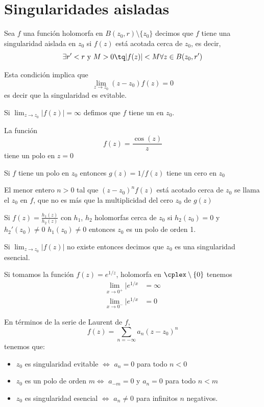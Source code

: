 \documentclass{apuntes}
\begin{document}
\section{Singularidades aisladas}

\begin{defn}
Sea $f$ una función holomorfa en $B(z_0,r)\setminus\{z_0\}$ decimos que $f$ tiene una singularidad aislada en $z_0$ si $f(z)$ está acotada cerca de $z_0$, es decir,
\[\exists r'<r \text{ y } M>0 \tq |f(z)| < M \forall z \in B(z_0, r')\]

Esta condición implica que
\[\lim_{z \to z_0}(z-z_0)f(z)=0\]
es decir que la singularidad es evitable.
\end{defn}

Si $\lim_{z \to z_0}|f(z)|=\infty$ defimos que $f$ tiene un  en $z_0$.

\begin{example}
La función
\[f(z)=\frac{\cos(z)}{z}\]
tiene un polo en $z=0$
\end{example}

\obs Si $f$ tiene un polo en $z_0$ entonces $g(z)=1/f(z)$ tiene un cero en $z_0$

El menor entero $n>0$ tal que $(z-z_0)^nf(z)$ está acotado cerca de $z_0$ se llama el  $z_0$ en $f$, que no es más que la multiplicidad del cero $z_0$ de $g(z)$

\obs Si $f(z)=\frac{h_1(z)}{h_2(z)}$ con $h_1$, $h_2$ holomorfas cerca de $z_0$ si $h_2(z_0)=0$ y $h_2'(z_0)\neq 0$ $h_1(z_0)\neq 0$ entonces $z_0$ es un polo de orden 1.

\begin{defn}
Si $\lim_{z \to z_0} |f(z)|$ no existe entonces decimos que $z_0$ es una singularidad esencial.
\end{defn}

\begin{example}
Si tomamos la función $f(z)=e^{1/z}$, holomorfa en $\cplex \setminus \{0\}$ tenemos
\begin{align}
\lim_{x \to 0^+}|e^{1/x}&=\infty\\
\lim_{x \to 0^-}|e^{1/x}&=0
\end{align}
\end{example}

En términos de la serie de Laurent de $f$,
\[f(z)=\sum_{n=-\infty}a_n(z-z_0)^n\]
tenemos que:
\begin{itemize}
\item $z_0$ es singularidad evitable $\iff$ $a_n=0$ para todo $n < 0$
\item $z_0$ es un polo de orden $m \iff$ $a_{-m}=0$ y $a_n=0$ para todo $n<m$
\item $z_0$ es singularidad esencial $\iff$ $a_n \neq 0$ para infinitos $n$ negativos.
\end{itemize}
\end{document}
